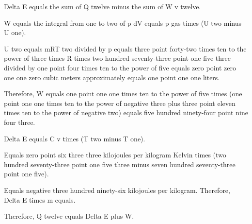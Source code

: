 Delta E equals the sum of Q twelve minus the sum of W v twelve.

W equals the integral from one to two of p dV equals p gas times (U two minus U one).

U two equals mRT two divided by p equals three point forty-two times ten to the power of three times R times two hundred seventy-three point one five three divided by one point four times ten to the power of five equals zero point zero one one zero cubic meters approximately equals one point one one liters.

Therefore, W equals one point one one times ten to the power of five times (one point one one times ten to the power of negative three plus three point eleven times ten to the power of negative two) equals five hundred ninety-four point nine four three.

Delta E equals C v times (T two minus T one).

Equals zero point six three three kilojoules per kilogram Kelvin times (two hundred seventy-three point one five three minus seven hundred seventy-three point one five).

Equals negative three hundred ninety-six kilojoules per kilogram. Therefore, Delta E times m equals.

Therefore, Q twelve equals Delta E plus W.